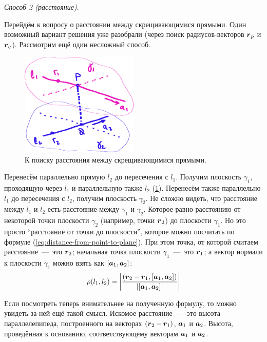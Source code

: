 \documentclass[a4paper,12pt]{article}
\begin{document}
\begin{solution}
    \medskip
    
    \emph{Способ 2 (расстояние)}.
    
    Перейдём к вопросу о расстоянии между скрещивающимися прямыми.
    Один возможный вариант решения уже разобрали (через поиск радиусов-векторов $\boldsymbol r_p$ и $\boldsymbol r_q$).
    Рассмотрим ещё один несложный способ.
    
    \begin{figure}[h]
      \centering
      
      \includegraphics[width=0.5\textwidth]{skew-gamma1-gamma2}
      
      \caption{К поиску расстояния между скрещивающимися прямыми.}
      \label{fig:skew-gamma1-gamma2}
    \end{figure}
    
    Перенесём параллельно прямую $l_2$ до пересечения с $l_1$.
    Получим плоскость $\gamma_1$, проходящую через $l_1$ и параллельную также $l_2$ (\ref{fig:skew-gamma1-gamma2}).
    Перенесём также параллельно $l_1$ до пересечения с $l_2$, получим плоскость $\gamma_2$.
    Не сложно видеть, что расстояние между $l_1$ и $l_2$ есть расстояние между $\gamma_1$ и $\gamma_2$.
    Которое равно расстоянию от некоторой точки плоскости $\gamma_2$ (например, точки $\boldsymbol r_2$) до плоскости $\gamma_1$.
    Но это просто ``расстояние от точки до плоскости'', которое можно посчитать по формуле (\ref{eq:distance-from-point-to-plane}).
    При этом точка, от которой считаем расстояние~---~это $\boldsymbol r_2$; начальная точка плоскости $\gamma_1$~---~это $\boldsymbol r_1$; а вектор нормали к плоскости $\gamma_1$ можно взять как $[\boldsymbol a_1, \boldsymbol a_2]$:
    \[
      \rho(l_1, l_2) = \left|\frac{(\boldsymbol r_2 - \boldsymbol r_1, [\boldsymbol a_1, \boldsymbol a_2])}{|[\boldsymbol a_1, \boldsymbol a_2]|}\right|
    \]
    
    Если посмотреть теперь внимательнее на полученную формулу, то можно увидеть за ней ещё такой смысл.
    Искомое расстояние~---~это высота параллелепипеда, построенного на векторах $(\bds r_2 \hm- \bds r_1)$, $\boldsymbol a_1$ и $\boldsymbol a_2$.
    Высота, проведённая к основанию, соответствующему векторам $\boldsymbol a_1$ и $\boldsymbol a_2$.
  \end{solution}
  
\end{document}
